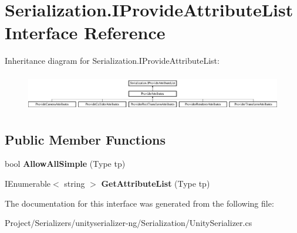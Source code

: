 \hypertarget{interface_serialization_1_1_i_provide_attribute_list}{}\section{Serialization.\+I\+Provide\+Attribute\+List Interface Reference}
\label{interface_serialization_1_1_i_provide_attribute_list}
Inheritance diagram for Serialization.\+I\+Provide\+Attribute\+List\+:\begin{figure}[H]
\begin{center}
\leavevmode
\includegraphics[height=1.631068cm]{interface_serialization_1_1_i_provide_attribute_list}
\end{center}
\end{figure}
\subsection*{Public Member Functions}
\begin{DoxyCompactItemize}
\item 
\mbox{\label{interface_serialization_1_1_i_provide_attribute_list_a67a8c176842f57fb928e68e87fdc4ade}} 
bool {\bfseries Allow\+All\+Simple} (Type tp)
\item 
\mbox{\label{interface_serialization_1_1_i_provide_attribute_list_afd95d460c41d4fddfb45b9e342557d01}} 
I\+Enumerable$<$ string $>$ {\bfseries Get\+Attribute\+List} (Type tp)
\end{DoxyCompactItemize}


The documentation for this interface was generated from the following file\+:\begin{DoxyCompactItemize}
\item 
Project/\+Serializers/unityserializer-\/ng/\+Serialization/Unity\+Serializer.\+cs\end{DoxyCompactItemize}
